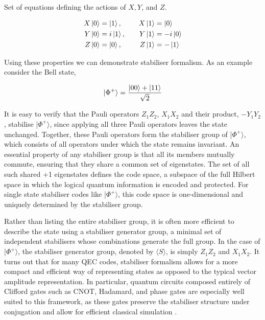 Set of equations defining the actions of \(X, Y\), and \(Z\).

\begin{equation}    
\label{eq:actions of pauli operators}
\begin{aligned}
X \ket{0} &= \ket{1}, & \quad X \ket{1} &= \ket{0} \\
Y \ket{0} &= i\ket{1}, & \quad Y \ket{1} &= -i\ket{0} \\
Z \ket{0} &= \ket{0}, & \quad Z \ket{1} &= -\ket{1}
\end{aligned}
\end{equation}

Using these properties we can demonstrate stabiliser formalism. As an example consider the Bell state,

\begin{equation}
    |\Phi^+\rangle = \frac{\ket{00}+\ket{11}}{\sqrt{2}}
\end{equation}

It is easy to verify that the Pauli operators \(Z_1Z_2\), \(X_1X_2\) and their product, \(-Y_1Y_2\), stabilise |\(\Phi^+\rangle\), since applying all three Pauli operators leaves the state unchanged. Together, these Pauli operators form the stabiliser group of |\(\Phi^+\rangle\), which consists of all operators under which the state remains invariant. An essential property of any stabiliser group is that all its members mutually commute, ensuring that they share a common set of eigenstates. The set of all such shared +1 eigenstates defines the code space, a subspace of the full Hilbert space in which the logical quantum information is encoded and protected. For single state stabiliser codes like |\(\Phi^+\rangle\), this code space is one-dimensional and uniquely determined by the stabiliser group.

Rather than listing the entire stabiliser group, it is often more efficient to describe the state using a stabiliser generator group, a minimal set of independent stabilisers whose combinations generate the full group. In the case of |\(\Phi^+\rangle\), the stabiliser generator group, denoted by \(\langle S\rangle\), is simply \(Z_1Z_2\) and \(X_1X_2\). It turns out that for many QEC codes, stabiliser formalism allows for a more compact and efficient way of representing states as opposed to the typical vector amplitude representation. In particular, quantum circuits composed entirely of Clifford gates such as CNOT, Hadamard, and phase gates are especially well suited to this framework, as these gates preserve the stabiliser structure under conjugation and allow for efficient classical simulation \cite{Aaronson_2004}.


